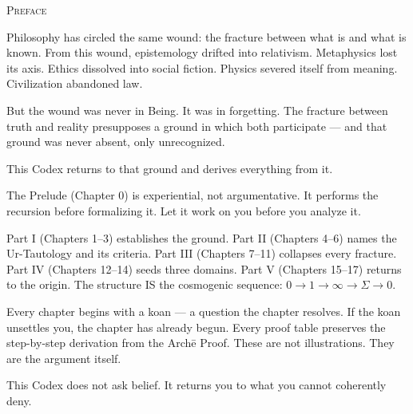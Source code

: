 \documentclass[10pt, openany, oneside]{book}
\renewcommand{\huge}{\fontsize{17}{21}\selectfont}
\begin{document}
\begin{center}
    {\huge\scshape Preface}
\end{center}

\vspace{1.5em}

\noindent Philosophy has circled the same wound: the fracture between what is and what is known. From this wound, epistemology drifted into relativism. Metaphysics lost its axis. Ethics dissolved into social fiction. Physics severed itself from meaning. Civilization abandoned law.

\vspace{0.5em}

\noindent But the wound was never in Being. It was in forgetting. The fracture between truth and reality presupposes a ground in which both participate --- and that ground was never absent, only unrecognized.

\vspace{0.5em}

\noindent This Codex returns to that ground and derives everything from it.

\vspace{1em}

\noindent The Prelude (Chapter 0) is experiential, not argumentative. It performs the recursion before formalizing it. Let it work on you before you analyze it.

\vspace{0.5em}

\noindent Part I (Chapters 1--3) establishes the ground. Part II (Chapters 4--6) names the Ur-Tautology and its criteria. Part III (Chapters 7--11) collapses every fracture. Part IV (Chapters 12--14) seeds three domains. Part V (Chapters 15--17) returns to the origin. The structure IS the cosmogenic sequence: $0 \to 1 \to \infty \to \Sigma \to 0$.

\vspace{0.5em}

\noindent Every chapter begins with a koan --- a question the chapter resolves. If the koan unsettles you, the chapter has already begun. Every proof table preserves the step-by-step derivation from the Arch\={e} Proof. These are not illustrations. They are the argument itself.

\vspace{0.5em}

\noindent This Codex does not ask belief. It returns you to what you cannot coherently deny.

\newpage
\end{document}
